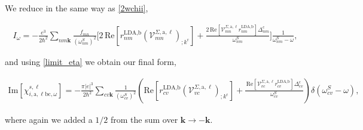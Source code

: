 We reduce in the same way as \eqref{2wchii}, %

\begin{eqnarray}\label{wchii_simplified}
I_{\omega}
= -\frac{e^3}{2\hbar^2}\sum_{nm\mathbf{k}}\frac{f_{mn}}{(\omega^{S}_{nm})^{2}}
\Biggl[
2\,\mathrm{Re}\left[r^{\text{LDA,b}}_{nm}\left(\mathcal{V}^{\Sigma,\text{a},\ell}_{mn}\right)_{;k^{\text{c}}}\right]
+\frac{2\,\mathrm{Re}\left[\mathcal{V}^{\Sigma,\text{a},\ell}_{mn}r^{\text{LDA,b}}_{nm}\right]\Delta^{\text{c}}_{nm}}{\omega^{S}_{nm}} 
\Biggr]\frac{1}{\omega^{S}_{nm}-\omega},
\end{eqnarray}

and using \eqref{limit_eta} we obtain our final form,

\begin{eqnarray}
\mathrm{Im}[\chi_{i,\text{a},\ell\text{b}\text{c},\omega}^{s,\ell}]
= -\frac{\pi\vert e\vert^3}{2\hbar^2}\sum_{cv\mathbf{k}}\frac{1}{(\omega^{S}_{cv})^{2}}
\left(
\mathrm{Re}\left[r^{\text{LDA,b}}_{cv}\left(\mathcal{V}^{\Sigma,\text{a},\ell}_{vc}\right)_{;k^{\text{c}}}\right]
+\frac{\,\mathrm{Re}\left[\mathcal{V}^{\Sigma,\text{a},\ell}_{vc}r^{\text{LDA,b}}_{cv}\right]\Delta^{\text{c}}_{cv}}{\omega^{S}_{cv}} 
\right)\delta(\omega^{S}_{cv}-\omega),
\end{eqnarray}

where again we added a $1/2$ from the sum over $\mathbf{k} \rightarrow - \mathbf{k}$.
